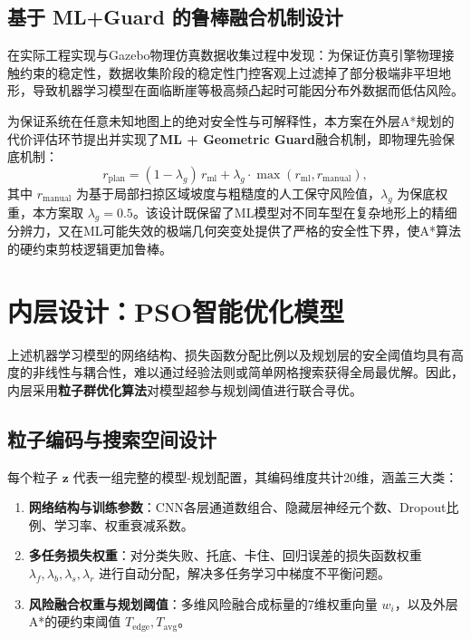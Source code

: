\documentclass[12pt, a4paper]{article}
\begin{document}
\subsection{基于 ML+Guard 的鲁棒融合机制设计}
在实际工程实现与Gazebo物理仿真数据收集过程中发现：为保证仿真引擎物理接触约束的稳定性，数据收集阶段的稳定性门控客观上过滤掉了部分极端非平坦地形，导致机器学习模型在面临断崖等极高频凸起时可能因分布外数据而低估风险。

为保证系统在任意未知地图上的绝对安全性与可解释性，本方案在外层A*规划的代价评估环节提出并实现了\textbf{ML + Geometric Guard}融合机制，即物理先验保底机制：
\begin{equation}
    r_{\text{plan}} = (1-\lambda_g) \, r_{\text{ml}} + \lambda_g \cdot \max(r_{\text{ml}}, r_{\text{manual}}),
\end{equation}
其中 \(r_{\text{manual}}\) 为基于局部扫掠区域坡度与粗糙度的人工保守风险值，\(\lambda_g\) 为保底权重，本方案取 \(\lambda_g = 0.5\)。该设计既保留了ML模型对不同车型在复杂地形上的精细分辨力，又在ML可能失效的极端几何突变处提供了严格的安全性下界，使A*算法的硬约束剪枝逻辑更加鲁棒。


\section{内层设计：PSO智能优化模型}

上述机器学习模型的网络结构、损失函数分配比例以及规划层的安全阈值均具有高度的非线性与耦合性，难以通过经验法则或简单网格搜索获得全局最优解。因此，内层采用\textbf{粒子群优化算法}对模型超参与规划阈值进行联合寻优。

\subsection{粒子编码与搜索空间设计}
每个粒子 \(\mathbf{z}\) 代表一组完整的模型-规划配置，其编码维度共计20维，涵盖三大类：

\begin{enumerate}
    \item \textbf{网络结构与训练参数}：CNN各层通道数组合、隐藏层神经元个数、Dropout比例、学习率、权重衰减系数。
    \item \textbf{多任务损失权重}：对分类失败、托底、卡住、回归误差的损失函数权重 \(\lambda_f, \lambda_b, \lambda_s, \lambda_r\) 进行自动分配，解决多任务学习中梯度不平衡问题。
    \item \textbf{风险融合权重与规划阈值}：多维风险融合成标量的7维权重向量 \(w_i\)，以及外层A*的硬约束阈值 \(T_{\text{edge}}, T_{\text{avg}}\)。
\end{enumerate}
\end{document}
